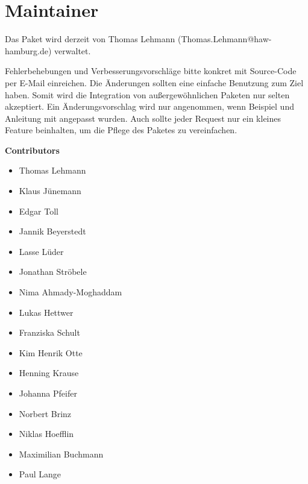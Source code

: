 %
\section{Maintainer}\label{sec:maintainer}
Das Paket wird derzeit von Thomas Lehmann (Thomas.Lehmann@haw-hamburg.de) verwaltet.

Fehlerbehebungen und Verbesserungsvorschläge bitte konkret mit Source-Code per E-Mail einreichen. Die Änderungen sollten eine einfache Benutzung zum Ziel haben.  Somit wird die Integration von außergewöhnlichen Paketen nur selten akzeptiert.  Ein Änderungsvorschlag wird nur angenommen,  wenn Beispiel und Anleitung mit angepasst wurden. Auch sollte jeder Request nur ein kleines Feature beinhalten,  um die Pflege des Paketes zu vereinfachen.

\textbf{Contributors}
\begin{itemize}
\item Thomas Lehmann
\item Klaus Jünemann
\item Edgar Toll
\item Jannik Beyerstedt
\item Lasse Lüder
\item Jonathan Ströbele
\item Nima Ahmady-Moghaddam	
\item Lukas Hettwer
\item Franziska Schult
\item Kim Henrik Otte
\item Henning Krause
\item Johanna Pfeifer
\item Norbert Brinz
\item Niklas Hoefflin
\item Maximilian Buchmann
\item Paul Lange
\end{itemize}
